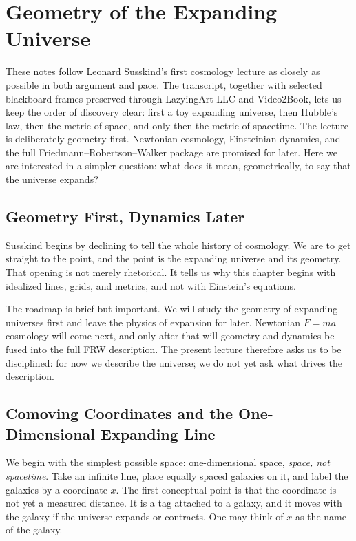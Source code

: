 \chapter{Geometry of the Expanding Universe}

These notes follow Leonard Susskind's first cosmology lecture as closely as possible in both argument and pace. The transcript, together with selected blackboard frames preserved through LazyingArt LLC and Video2Book, lets us keep the order of discovery clear: first a toy expanding universe, then Hubble's law, then the metric of space, and only then the metric of spacetime. The lecture is deliberately geometry-first. Newtonian cosmology, Einsteinian dynamics, and the full Friedmann--Robertson--Walker package are promised for later. Here we are interested in a simpler question: what does it mean, geometrically, to say that the universe expands?

\section{Geometry First, Dynamics Later}

Susskind begins by declining to tell the whole history of cosmology. We are to get straight to the point, and the point is the expanding universe and its geometry. That opening is not merely rhetorical. It tells us why this chapter begins with idealized lines, grids, and metrics, and not with Einstein's equations.

The roadmap is brief but important. We will study the geometry of expanding universes first and leave the physics of expansion for later. Newtonian \(F=ma\) cosmology will come next, and only after that will geometry and dynamics be fused into the full FRW description. The present lecture therefore asks us to be disciplined: for now we describe the universe; we do not yet ask what drives the description.

\section{Comoving Coordinates and the One-Dimensional Expanding Line}

We begin with the simplest possible space: one-dimensional space, \emph{space, not spacetime}. Take an infinite line, place equally spaced galaxies on it, and label the galaxies by a coordinate \(x\). The first conceptual point is that the coordinate is not yet a measured distance. It is a tag attached to a galaxy, and it moves with the galaxy if the universe expands or contracts. One may think of \(x\) as the name of the galaxy.

